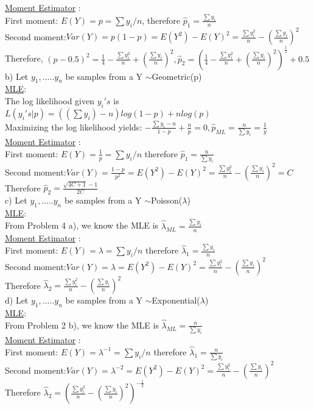 \documentclass[11pt]{article}
\begin{document}
\underline{Moment Estimator} :\\
First moment: $E(Y) = p = \sum y_i/n $, therefore $\hat{p}_1 = \frac{\sum y_i}{n}$\\
Second moment:$Var(Y) = p(1-p) = E(Y^2) - E(Y)^2 = \frac{\sum y_i^2}{n} - (\frac{\sum y_i}{n})^2$\\
Therefore, $(p - 0.5)^2 = \frac{1}{4} - \frac{\sum y_i^2}{n} + (\frac{\sum y_i}{n})^2, \hat{p}_2 = (\frac{1}{4} - \frac{\sum y_i^2}{n} + (\frac{\sum y_i}{n})^2)^{\frac{1}{2}} +0.5$\\

b) Let $y_1,.....y_n$ be samples from a Y $\sim $Geometric(p)\\
\underline{MLE}:\\
The log likelihood given $y_i's$ is $L(y_i's|p) = ((\sum y_i) - n)log(1-p)  + n log(p)$\\
Maximizing the log likelihood yields: $-\frac{\sum y_i - n}{1- p } + \frac{n}{p} = 0, \hat{p}_{ML}  = \frac{n}{\sum y_i} = \frac{1}{\bar{y}}$\\

\underline{Moment Estimator} :\\
First moment: $E(Y) = \frac{1}{p} = \sum y_i/n $ therefore $\hat{p}_1 = \frac{n}{\sum y_i}$\\
Second moment:$Var(Y) = \frac{1-p}{p^2} = E(Y^2) - E(Y)^2 =  \frac{\sum y_i^2}{n} - (\frac{\sum y_i}{n})^2 = C$\\
Therefore $ \hat{p}_2 = \frac{\sqrt{4C+1}-1}{2C}$\\

c) Let $y_1,.....y_n$ be samples from a Y $\sim $Poisson($\lambda$)\\
\underline{MLE}:\\
From Problem 4 a), we know the MLE is $\hat{\lambda}_{ML} = \frac{\sum y_i}{n}$\\

\underline{Moment Estimator} :\\
First moment: $E(Y) = \lambda = \sum y_i/n $ therefore $\hat{\lambda}_1 = \frac{\sum y_i}{n}$\\
Second moment:$Var(Y) = \lambda = E(Y^2) - E(Y)^2 =  \frac{\sum y_i^2}{n} - (\frac{\sum y_i}{n})^2$\\
Therefore $ \hat{\lambda}_2 = \frac{\sum y_i^2}{n} - (\frac{\sum y_i}{n})^2$\\

d) Let $y_1,.....y_n$ be samples from a Y $\sim $Exponential($\lambda$)\\
\underline{MLE}:\\
From Problem 2 b), we know the MLE is $\hat{\lambda}_{ML} = \frac{n}{\sum y_i}$\\

\underline{Moment Estimator} :\\
First moment: $E(Y) = \lambda^{-1} = \sum y_i/n $ therefore $\hat{\lambda}_1 = \frac{n}{\sum y_i}$\\
Second moment:$Var(Y) = \lambda^{-2}= E(Y^2) - E(Y)^2 =  \frac{\sum y_i^2}{n} - (\frac{\sum y_i}{n})^2$\\
Therefore $ \hat{\lambda}_2 = (\frac{\sum y_i^2}{n} - (\frac{\sum y_i}{n})^2)^{-\frac{1}{2}}$\\
\end{document}
